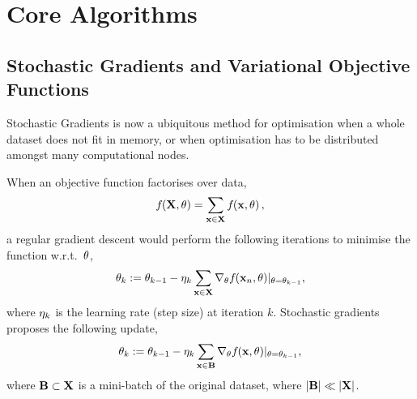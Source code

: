 \documentclass[11pt, oneside]{article}
\title{\sffamily{\emph{revrand}: Technical Report}}
\author{Daniel Steinberg, Louis Tiao \\
    Data61 $|$ CSIRO \\
    email: \texttt{\{firstname.lastname\}@data61.csiro.au}
}
\date{}
\begin{document}
\maketitle
\vspace{-0.5cm}
\noindent\makebox[\linewidth]{\rule{\linewidth}{0.8pt}}
\vspace{0.3cm}

\begin{abstract}
    This is a technical report on the \emph{revrand} software library. This
    library implements various Bayesian linear models (Bayesian linear
    regression), approximate Gaussian processes and generalised linear models.
    These algorithms have been implemented such that they can be used for
    large-scale inference by using stochastic gradients. All of the algorithms
    in \emph{revrand} use a unified feature composition framework, that allows
    for easy composition of positive-definite covariance functions and easy
    manipulation and combination of regression basis functions.
\end{abstract}

\tableofcontents

\section{Core Algorithms}

\subsection{Stochastic Gradients and Variational Objective Functions}

Stochastic Gradients is now a ubiquitous method for optimisation when a whole
dataset does not fit in memory, or when optimisation has to be distributed
amongst many computational nodes.

When an objective function factorises over data,
\begin{equation}
    f_{}\!\left({{\mathbf{X}, \theta}}\right) = \sum_{\mathbf{x} \in \mathbf{X}} f_{}\!\left({{\mathbf{x}, \theta}}\right),
\end{equation}
a regular gradient descent would perform the following iterations to minimise
the function w.r.t.\ $\theta$,
\begin{equation}
    \theta_k := \theta_{k-1} - \eta_k \sum_{\mathbf{x} \in \mathbf{X}}
    \nabla_{\theta} f_{}\!\left({{\mathbf{x}_n, \theta}}\right)\!|_{\theta = \theta_{k-1}},
\end{equation}
where $\eta_k$ is the learning rate (step size) at iteration $k$. Stochastic
gradients proposes the following update,
\begin{equation}
    \theta_k := \theta_{k-1} - \eta_k \sum_{\mathbf{x} \in \mathbf{B}}
    \nabla_{\theta} f_{}\!\left({{\mathbf{x}, \theta}}\right)\!|_{\theta = \theta_{k-1}},
    \label{eq:sg}
\end{equation}
where $\mathbf{B} \subset \mathbf{X}$ is a mini-batch of the original dataset, where
$|\mathbf{B}| \ll |\mathbf{X}|$.
\end{document}
